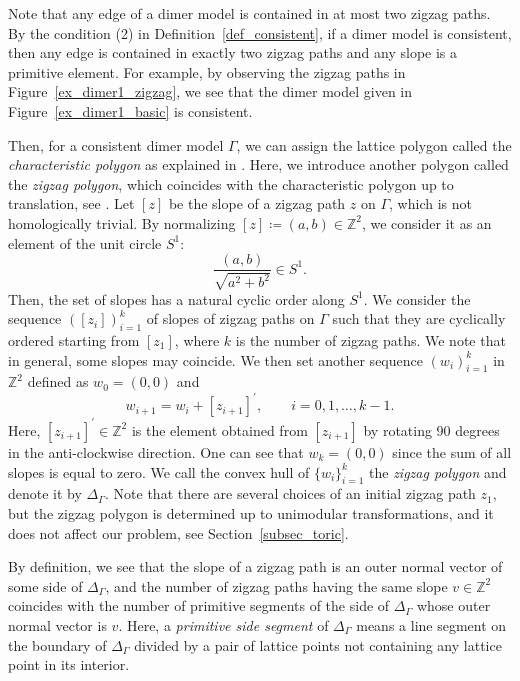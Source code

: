 \documentclass[10pt,a4paper]{amsart}
\numberwithin{equation}{section}
\theoremstyle{definition}
\newcommand{\ZZ}{\mathbb{Z}}
\begin{document}
Note that any edge of a dimer model is contained in at most two zigzag paths.
By the condition (2) in Definition~\ref{def_consistent},
if a dimer model is consistent, then any edge is contained in exactly two zigzag paths and any slope is a primitive element.
For example, by observing the zigzag paths in Figure~\ref{ex_dimer1_zigzag}, we see that the dimer model given in Figure~\ref{ex_dimer1_basic} is consistent.

Then, for a consistent dimer model $\Gamma$, we can assign the lattice polygon called the \emph{characteristic polygon} as explained in
\cite[Section~5.2]{IU_special}.
Here, we introduce another polygon called the \emph{zigzag polygon}, which coincides with the characteristic polygon up to translation, see \cite[Theorem~12.1]{IU_special}.
Let $[z]$ be the slope of a zigzag path $z$ on $\Gamma$, which is not homologically trivial.
By normalizing $[z]\coloneqq (a,b)\in\ZZ^2$, we consider it as an element of the unit circle $S^1$:
\[
\frac{(a,b)}{\sqrt{a^2+b^2}}\in S^1.
\]
Then, the set of slopes has a natural cyclic order along $S^1$.
We consider the sequence $([z_i])_{i=1}^k$ of slopes of zigzag paths on $\Gamma$ such that
they are cyclically ordered starting from $[z_1]$, where $k$ is the number of zigzag paths.
We note that in general, some slopes may coincide.
We then set another sequence $(w_i)_{i=1}^{k}$ in $\ZZ^2$ defined as $w_0=(0,0)$ and
\[
w_{i+1}=w_i+[z_{i+1}]^\prime, \qquad i=0,1,\dots,k-1.
\]
Here, $[z_{i+1}]^\prime\in\ZZ^2$ is the element obtained from $[z_{i+1}]$ by rotating 90 degrees in the anti-clockwise direction.
One can see that $w_k=(0,0)$ since the sum of all slopes is equal to zero.
We call the convex hull of $\{w_i\}_{i=1}^{k}$ the \emph{zigzag polygon} and denote it by $\Delta_\Gamma$.
Note that there are several choices of an initial zigzag path $z_1$, but the zigzag polygon is determined up to unimodular transformations,
and it does not affect our problem, see Section~\ref{subsec_toric}.

By definition, we see that the slope of a zigzag path is an outer normal vector of some side of $\Delta_\Gamma$,
and the number of zigzag paths having the same slope $v\in\ZZ^2$ coincides with the number of primitive segments of
the side of $\Delta_\Gamma$ whose outer normal vector is $v$.
Here, a \emph{primitive side segment} of $\Delta_\Gamma$ means a line segment on the boundary of $\Delta_\Gamma$
divided by a pair of lattice points not containing any lattice point in its interior.
\end{document}

